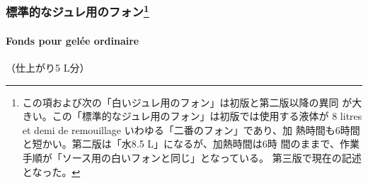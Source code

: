 \vspace*{1.7\zw}
\begin{recette}
\hypertarget{ux6a19ux6e96ux7684ux306aux30b8ux30e5ux30ecux7528ux306eux30d5ux30a9ux30f39}{%
\subsubsection[標準的なジュレ用のフォン]{\texorpdfstring{標準的なジュレ用のフォン\footnote{この項および次の「白いジュレ用のフォン」は初版と第二版以降の異同
  が大きい。この「標準的なジュレ用のフォン」は初版では使用する液体が 8
  litres et demi de remouillage いわゆる「二番のフォン」であり、加
  熱時間も6時間と短かい。第二版は「水8.5 L」になるが、加熱時間は6時
  間のままで、作業手順が「ソース用の白いフォンと同じ」となっている。
  第三版で現在の記述となった。}}{標準的なジュレ用のフォン}}\label{ux6a19ux6e96ux7684ux306aux30b8ux30e5ux30ecux7528ux306eux30d5ux30a9ux30f39}}

\hypertarget{fonds-pour-gelee-ordinaire}{%
\paragraph{Fonds pour gelée
ordinaire}\label{fonds-pour-gelee-ordinaire}}


（仕上がり5 L分）


\end{recette}
